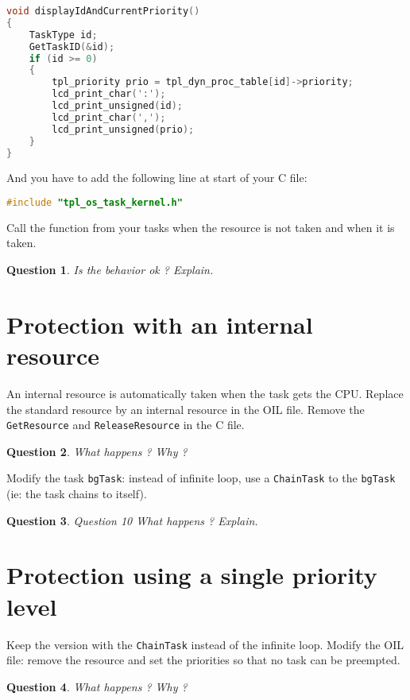 \documentclass[11pt]{article}
\newtheorem{ex}{Question}
\begin{document}
\begin{lstlisting}[language=C]
void displayIdAndCurrentPriority()
{
    TaskType id;
    GetTaskID(&id);
    if (id >= 0)
    {
        tpl_priority prio = tpl_dyn_proc_table[id]->priority;
        lcd_print_char(':');
        lcd_print_unsigned(id);
        lcd_print_char(','); 
        lcd_print_unsigned(prio);
    }
}
\end{lstlisting}

And you have to add the following line at start of your C file:

\begin{lstlisting}[language=C]
 #include "tpl_os_task_kernel.h"
\end{lstlisting}

Call the function from your tasks when the resource is not taken and when it is taken.

\begin{ex}
Is the behavior ok ? Explain.
\end{ex}

\section{Protection with an internal resource}

An internal resource is automatically taken when the task gets the CPU. Replace the standard resource by an internal resource in the OIL file. Remove the \texttt{GetResource} and \texttt{ReleaseResource} in the C file.

\begin{ex}
What happens ? Why ?
\end{ex}

Modify the task \texttt{bgTask}: instead of infinite loop, use a \texttt{ChainTask} to the \texttt{bgTask} (ie: the task chains to itself).

\begin{ex}
Question 10 What happens ? Explain.
\end{ex}

\section{Protection using a single priority level}

Keep the version with the \texttt{ChainTask} instead of the infinite loop.
Modify the OIL file: remove the resource and set the priorities so that no task
can be preempted.

\begin{ex}
What happens ? Why ?
\end{ex}
\end{document}
